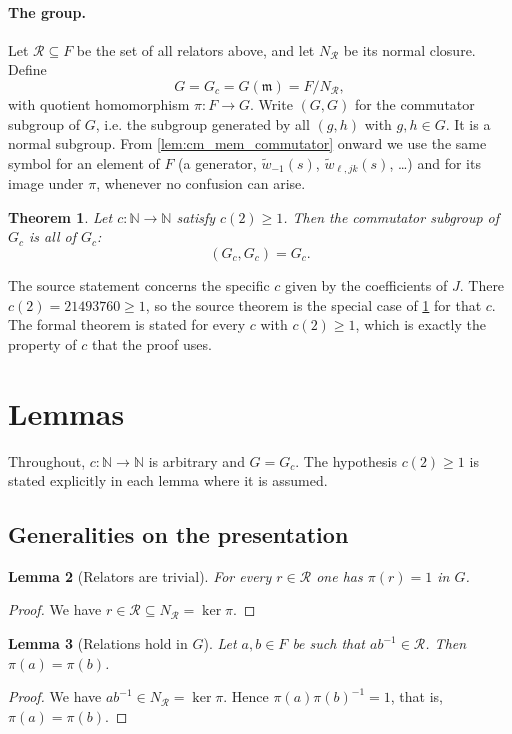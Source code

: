 \documentclass[11pt]{article}
\newtheorem{theorem}{Theorem}[section]
\newtheorem{lemma}[theorem]{Lemma}
\theoremstyle{definition}
\theoremstyle{remark}
\newcommand{\N}{\mathbb{N}}
\newcommand{\wt}{\widetilde{w}}
\newcommand{\comm}{(G,G)}
\begin{document}
\paragraph{The group.}
Let $\mathcal R\subseteq F$ be the set of all relators above, and let $N_{\mathcal R}$ be its normal closure. Define
\[
G=G_c=G(\mathfrak m)=F/N_{\mathcal R},
\]
with quotient homomorphism $\pi\colon F\to G$. Write $\comm$ for the commutator subgroup of $G$, i.e. the subgroup generated by all $(g,h)$ with $g,h\in G$. It is a normal subgroup. From \cref{lem:cm_mem_commutator} onward we use the same symbol for an element of $F$ (a generator, $\wt_{-1}(s)$, $\wt_{\ell,jk}(s)$, \dots) and for its image under $\pi$, whenever no confusion can arise.

\begin{theorem}\label{thm:main}
Let $c\colon\N\to\N$ satisfy $c(2)\ge 1$. Then the commutator subgroup of $G_c$ is all of $G_c$:
\[
(G_c,G_c)=G_c .
\]
\end{theorem}

The source statement concerns the specific $c$ given by the coefficients of $J$. There $c(2)=21493760\ge 1$, so the source theorem is the special case of \cref{thm:main} for that $c$. The formal theorem is stated for every $c$ with $c(2)\ge 1$, which is exactly the property of $c$ that the proof uses.

\section{Lemmas}

Throughout, $c\colon\N\to\N$ is arbitrary and $G=G_c$. The hypothesis $c(2)\ge 1$ is stated explicitly in each lemma where it is assumed.

\subsection{Generalities on the presentation}

\begin{lemma}[Relators are trivial]\label{lem:mk_rel_one}
For every $r\in\mathcal R$ one has $\pi(r)=1$ in $G$.
\end{lemma}
\begin{proof}
We have $r\in\mathcal R\subseteq N_{\mathcal R}=\ker\pi$.
\end{proof}

\begin{lemma}[Relations hold in $G$]\label{lem:mk_eqr}
Let $a,b\in F$ be such that $ab^{-1}\in\mathcal R$. Then $\pi(a)=\pi(b)$.
\end{lemma}
\begin{proof}
We have $ab^{-1}\in N_{\mathcal R}=\ker\pi$. Hence $\pi(a)\pi(b)^{-1}=1$, that is, $\pi(a)=\pi(b)$.
\end{proof}
\end{document}
